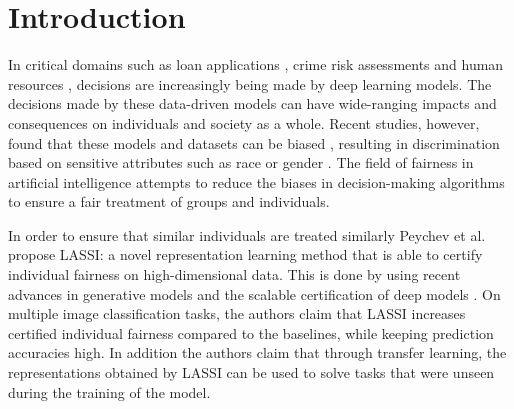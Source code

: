\section{Introduction}\label{sec:introduction}

In critical domains such as loan applications \cite{khandaniloans}, crime risk assessments \cite{brennancrimes} and human resources \cite{tambehr}, decisions are increasingly being made by deep learning models. The decisions made by these data-driven models can have wide-ranging impacts and consequences on individuals and society as a whole. Recent studies, however, found that these models and datasets can be biased \cite{buolamwini2018gender, klare2012face}, resulting in discrimination based on sensitive attributes such as race or gender \cite{hleg2019ethics, act2021proposal, jillson2021aiming}. The field of fairness in artificial intelligence attempts to reduce the biases in decision-making algorithms to ensure a fair treatment of groups and individuals. \newline


In order to ensure that similar individuals are treated similarly Peychev et al. \cite{peychev2022latent} propose LASSI: a novel representation learning method that is able to certify individual fairness on high-dimensional data. This is done by using recent advances in generative models \cite{kingmaglow} and the scalable certification of deep models \cite{cohendeeplearning}. On multiple image classification tasks, the authors claim that LASSI increases certified individual fairness compared to the baselines, while keeping prediction accuracies high. In addition the authors claim that through transfer learning, the representations obtained by LASSI can be used to solve tasks that were unseen during the training of the model.

